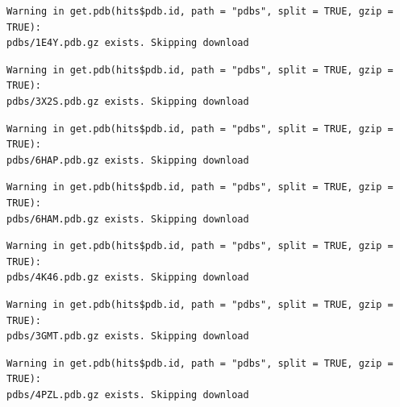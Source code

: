 \documentclass[
  letterpaper,
  DIV=11,
  numbers=noendperiod]{scrartcl}
\begin{document}
\begin{verbatim}
Warning in get.pdb(hits$pdb.id, path = "pdbs", split = TRUE, gzip = TRUE):
pdbs/1E4Y.pdb.gz exists. Skipping download
\end{verbatim}

\begin{verbatim}
Warning in get.pdb(hits$pdb.id, path = "pdbs", split = TRUE, gzip = TRUE):
pdbs/3X2S.pdb.gz exists. Skipping download
\end{verbatim}

\begin{verbatim}
Warning in get.pdb(hits$pdb.id, path = "pdbs", split = TRUE, gzip = TRUE):
pdbs/6HAP.pdb.gz exists. Skipping download
\end{verbatim}

\begin{verbatim}
Warning in get.pdb(hits$pdb.id, path = "pdbs", split = TRUE, gzip = TRUE):
pdbs/6HAM.pdb.gz exists. Skipping download
\end{verbatim}

\begin{verbatim}
Warning in get.pdb(hits$pdb.id, path = "pdbs", split = TRUE, gzip = TRUE):
pdbs/4K46.pdb.gz exists. Skipping download
\end{verbatim}

\begin{verbatim}
Warning in get.pdb(hits$pdb.id, path = "pdbs", split = TRUE, gzip = TRUE):
pdbs/3GMT.pdb.gz exists. Skipping download
\end{verbatim}

\begin{verbatim}
Warning in get.pdb(hits$pdb.id, path = "pdbs", split = TRUE, gzip = TRUE):
pdbs/4PZL.pdb.gz exists. Skipping download
\end{verbatim}
\end{document}
